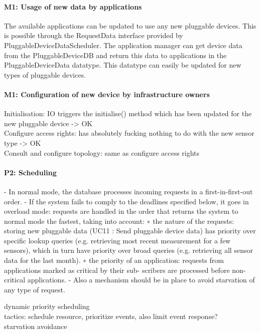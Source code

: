     \paragraph{M1: Usage of new data by applications}
        The available applications can be updated to use any new pluggable devices.
        This is possible through the RequestData interface provided by PluggableDeviceDataScheduler.
        The application manager can get device data from the PluggableDeviceDB and return this
        data to applications in the PluggableDeviceData datatype. This datatype can easily be
        updated for new types of pluggable devices.

    \paragraph{M1: Configuration of new device by infrastructure owners}
        Initialisation: IO triggers the initialise() method which has been
        updated for the new pluggable device -> OK\\
        Configure access rights: has absolutely fucking nothing to do with the
        new sensor type -> OK \\
        Consult and configure topology: same as configure access rights

    \paragraph{P2: Scheduling}
        - In normal mode, the database processes incoming requests in a first-in-first-out order.
        - If the system fails to comply to the deadlines specified below, it goes in overload mode: requests
            are handled in the order that returns the system to normal mode the fastest, taking into
            account:
            ∗ the nature of the requests: storing new pluggable data (UC11 : Send pluggable device
            data) has priority over specific lookup queries (e.g. retrieving most recent measurement
            for a few sensors), which in turn have priority over broad queries (e.g. retrieving all sensor
            data for the last month).
            ∗ the priority of an application: requests from applications marked as critical by their sub-
            scribers are processed before non-critical applications.
        - Also a mechanism should be in place to avoid starvation of any type of request.

        dynamic priority scheduling \\
        tactics: schedule resource, prioritize events, also limit event response?\\
        starvation avoidance

